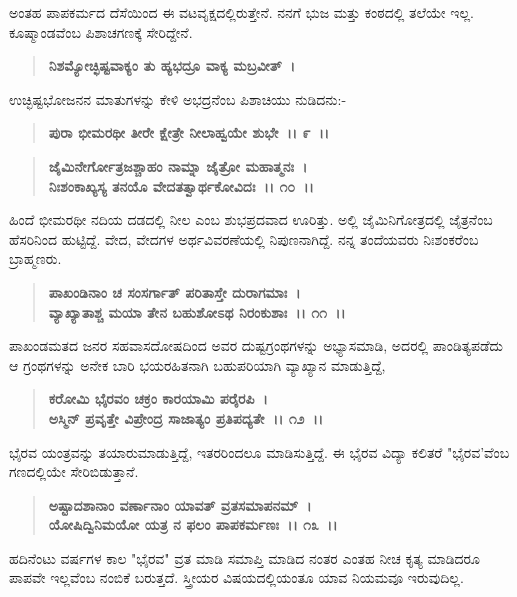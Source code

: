 ಅಂತಹ ಪಾಪಕರ್ಮದ ದೆಸೆಯಿಂದ ಈ ವಟವೃಕ್ಷದಲ್ಲಿರುತ್ತೇನೆ. ನನಗೆ ಭುಜ ಮತ್ತು ಕಂಠದಲ್ಲಿ ತಲೆಯೇ ಇಲ್ಲ. ಕೂಷ್ಮಾಂಡವೆಂಬ ಪಿಶಾಚಗಣಕ್ಕೆ ಸೇರಿದ್ದೇನೆ.

\begin{verse}
\textbf{ನಿಶಮ್ಯೋಚ್ಛಿಷ್ಟವಾಕ್ಯಂ ತು ಹ್ಯಭದ್ರೂ ವಾಕ್ಯ ಮಬ್ರವೀತ್~। }
\end{verse}

ಉಚ್ಛಿಷ್ಟಭೋಜನನ ಮಾತುಗಳನ್ನು ಕೇಳಿ ಅಭದ್ರನೆಂಬ ಪಿಶಾಚಿಯು ನುಡಿದನು:-

\begin{verse}
\textbf{ಪುರಾ ಭೀಮರಥೀ ತೀರೇ ಕ್ಷೇತ್ರೇ ನೀಲಾಹ್ವಯೇ ಶುಭೇ~।। ೯~।।} 
\end{verse}

\begin{verse}
\textbf{ಜೈಮಿನೇರ್ಗೋತ್ರಜಶ್ಚಾಹಂ ನಾಮ್ನಾ ಜೈತ್ರೋ ಮಹಾತ್ಮನಃ~।}\\\textbf{ನಿಃಶಂಕಾಖ್ಯಸ್ಯ ತನಯೊ ವೇದತತ್ವಾರ್ಥಕೋವಿದಃ~।। ೧೦~।।}
\end{verse}

ಹಿಂದೆ ಭೀಮರಥೀ ನದಿಯ ದಡದಲ್ಲಿ ನೀಲ ಎಂಬ ಶುಭಪ್ರದವಾದ ಊರಿತ್ತು. ಅಲ್ಲಿ ಜೈಮಿನಿ\-ಗೋತ್ರದಲ್ಲಿ ಜೈತ್ರನೆಂಬ ಹೆಸರಿನಿಂದ ಹುಟ್ಟಿದ್ದೆ. ವೇದ, ವೇದಗಳ ಅರ್ಥವಿವರಣೆಯಲ್ಲಿ ನಿಪುಣನಾಗಿದ್ದೆ. ನನ್ನ ತಂದೆಯವರು ನಿಃಶಂಕರೆಂಬ ಬ್ರಾಹ್ಮಣರು.

\begin{verse}
\textbf{ಪಾಖಂಡಿನಾಂ ಚ ಸಂಸರ್ಗಾತ್ ಪರಿತಾಸ್ತೇ ದುರಾಗಮಾಃ~।}\\\textbf{ವ್ಯಾಖ್ಯಾತಾಶ್ಚ ಮಯಾ ತೇನ ಬಹುಶೋಽಥ ನಿರಂಕುಶಾಃ~।। ೧೧~।।}
\end{verse}

ಪಾಖಂಡಮತದ ಜನರ ಸಹವಾಸದೋಷದಿಂದ ಅವರ ದುಷ್ಟಗ್ರಂಥಗಳನ್ನು ಅಭ್ಯಾಸಮಾಡಿ, ಅದರಲ್ಲಿ ಪಾಂಡಿತ್ಯಪಡೆದು ಆ ಗ್ರಂಥಗಳನ್ನು ಅನೇಕ ಬಾರಿ ಭಯರಹಿತನಾಗಿ ಬಹುಪರಿಯಾಗಿ ವ್ಯಾಖ್ಯಾನ ಮಾಡುತ್ತಿದ್ದೆ,

\begin{verse}
\textbf{ಕರೋಮಿ ಭೈರವಂ ಚಕ್ರಂ ಕಾರಯಾಮಿ ಪರೈರಪಿ~।}\\\textbf{ಅಸ್ಮಿನ್ ಪ್ರವೃತ್ತೇ ವಿಪ್ರೇಂದ್ರ ಸಾಜಾತ್ಯಂ ಪ್ರತಿಪದ್ಯತೇ~।। ೧೨~।।}
\end{verse}

ಭೈರವ ಯಂತ್ರವನ್ನು ತಯಾರುಮಾಡುತ್ತಿದ್ದೆ, ಇತರರಿಂದಲೂ ಮಾಡಿಸುತ್ತಿದ್ದೆ. ಈ ಭೈರವ ವಿದ್ಯಾ ಕಲಿತರೆ "ಭೈರವ'ವೆಂಬ ಗಣದಲ್ಲಿಯೇ ಸೇರಿಬಿಡುತ್ತಾನೆ.

\begin{verse}
\textbf{ಅಷ್ಟಾದಶಾನಾಂ ವರ್ಣಾನಾಂ ಯಾವತ್‌ ವ್ರತಸಮಾಪನಮ್~।}\\\textbf{ಯೋಷಿದ್ವಿನಿಮಯೋ ಯತ್ರ ನ ಫಲಂ ಪಾಪಕರ್ಮಣಃ~।। ೧೩~।।}
\end{verse}

ಹದಿನೆಂಟು ವರ್ಷಗಳ ಕಾಲ "ಭೈರವ" ವ್ರತ ಮಾಡಿ ಸಮಾಪ್ತಿ ಮಾಡಿದ ನಂತರ ಎಂತಹ ನೀಚ ಕೃತ್ಯ ಮಾಡಿದರೂ ಪಾಪವೇ ಇಲ್ಲವೆಂಬ ನಂಬಿಕೆ ಬರುತ್ತದೆ. ಸ್ತ್ರೀಯರ ವಿಷಯದಲ್ಲಿಯಂತೂ ಯಾವ ನಿಯಮವೂ ಇರುವುದಿಲ್ಲ.

